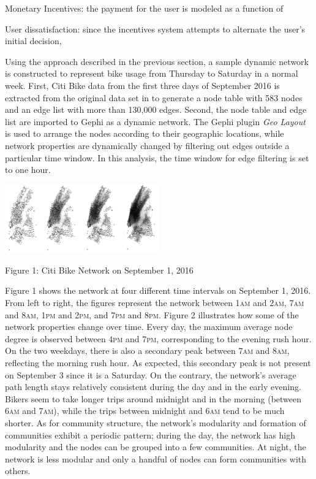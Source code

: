 \documentclass[times, 10pt,twocolumn]{article}
\begin{document}
Monetary Incentives: the payment for the user is modeled as a function of 

User dissatisfaction: since the incentives system attempts to alternate the user's initial decision, 

Using the approach described in the previous section, a sample dynamic network is constructed to represent bike usage from Thursday to Saturday in a normal week. First, Citi Bike data from the first three days of September 2016 is extracted from the original data set in \cite{dataset} to generate a node table with 583 nodes and an edge list with more than 130,000 edges. Second, the node table and edge list are imported to Gephi as a dynamic network. The Gephi plugin \textit{Geo Layout} is used to arrange the nodes according to their geographic locations, while network properties are dynamically changed by filtering out edges outside a particular time window. In this analysis, the time window for edge filtering is set to one hour.\\

\centerline{\includegraphics[width=0.5\textwidth]{m2/combined.jpg}}
\centerline{Figure 1: Citi Bike Network on September 1, 2016}

Figure 1 shows the network at four different time intervals on September 1, 2016. From left to right, the figures represent the network between 1\textsc{am} and 2\textsc{am}, 7\textsc{am} and 8\textsc{am}, 1\textsc{pm} and 2\textsc{pm}, and 7\textsc{pm} and 8\textsc{pm}. Figure 2 illustrates how some of the network properties change over time. Every day, the maximum average node degree is observed between 4\textsc{pm} and 7\textsc{pm}, corresponding to the evening rush hour. On the two weekdays, there is also a secondary peak between 7\textsc{am} and 8\textsc{am}, reflecting the morning rush hour. As expected, this secondary peak is not present on September 3 since it is a Saturday. On the contrary, the network's average path length stays relatively consistent during the day and in the early evening. Bikers seem to take longer trips around midnight and in the morning (between 6\textsc{am} and 7\textsc{am}), while the trips between midnight and 6\textsc{am} tend to be much shorter. As for community structure, the network's modularity and formation of communities exhibit a periodic pattern; during the day, the network has high modularity and the nodes can be grouped into a few communities. At night, the network is less modular and only a handful of nodes can form communities with others.
\end{document}

